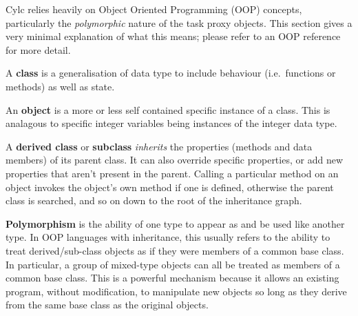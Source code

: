 \documentclass[11pt,a4paper]{article}
\begin{document}
Cylc relies heavily on Object Oriented Programming (OOP) concepts,
particularly the {\em polymorphic} nature of the task proxy objects.
This section gives a very minimal explanation of what this means;
please refer to an OOP reference for more detail.

A {\bf class} is a generalisation of data type to include behaviour
(i.e.\ functions or methods) as well as state. 


An {\bf object} is a more or less self contained specific instance
of a class. This is analagous to specific integer variables being 
instances of the integer data type.

A {\bf derived class} or {\bf subclass} {\em inherits} the properties
(methods and data members) of its parent class. It can also override
specific properties, or add new properties that aren't present in the
parent. Calling a particular method on an object invokes the object's
own method if one is defined, otherwise the parent class is searched,
and so on down to the root of the inheritance graph. 



{\bf Polymorphism} is the ability of one type to appear as and be used
like another type.  In OOP languages with inheritance, this usually
refers to the ability to treat derived/sub-class objects as if they were
members of a common base class. In particular, a group of mixed-type
objects can all be treated as members of a common base class. 
This is a powerful mechanism because it allows an existing program,
without modification, to manipulate new objects so long as they 
derive from the same base class as the original objects.
\end{document}

